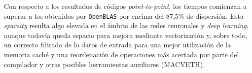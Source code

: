 Con respecto a los resultados de códigos \textit{point-to-point}, los tiempos comienzan a superar a los obtenidos por \texttt{OpenBLAS} por encima del 87,5\% de dispersión. Esta \textit{sparsity} resulta algo elevada en el ámbito de las redes reuronales y \textit{deep learning}, aunque todavía queda espacio para mejora mediante vectorización y, sobre todo, un correcto filtrado de lo datos de entrada para una mejor utilización de la memoria caché y una reordenación de operaciones más acertada por parte del compilador y otras posibles herramientas auxiliares (MACVETH).